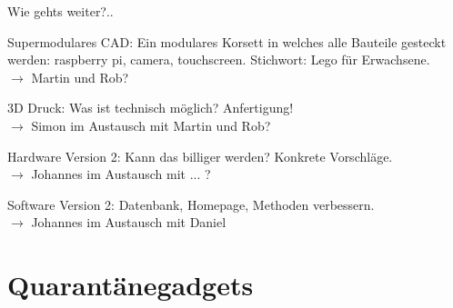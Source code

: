 \documentclass{beamer}
\begin{document}
\begin{frame}{Wie gehts weiter?..}

\begin{exampleblock}{Supermodulares CAD:}
Ein modulares Korsett in welches alle Bauteile gesteckt werden: raspberry pi, camera, touchscreen. Stichwort: Lego f\"ur Erwachsene.\\
$\rightarrow$ Martin und Rob?
\end{exampleblock}

\begin{exampleblock}{3D Druck:}
Was ist technisch m\"oglich? Anfertigung!\\
$\rightarrow$ Simon im Austausch mit Martin und Rob?
\end{exampleblock}

\begin{exampleblock}{Hardware Version 2:}
Kann das billiger werden? Konkrete Vorschl\"age.\\
$\rightarrow$ Johannes im Austausch mit ... ?
\end{exampleblock}

\begin{exampleblock}{Software Version 2:}
Datenbank, Homepage, Methoden verbessern.\\
$\rightarrow$ Johannes im Austausch mit Daniel
\end{exampleblock}

\end{frame}



\section{Quarant\"anegadgets}
\end{document}
